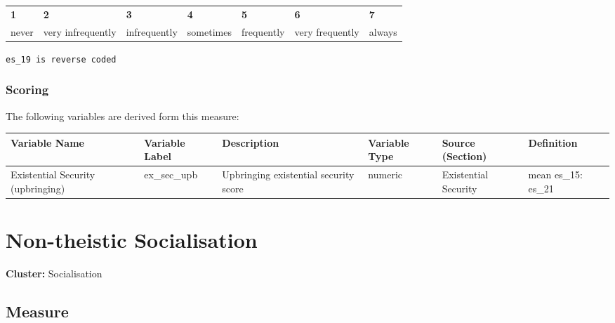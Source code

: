 \documentclass[
  letterpaper,
]{scrbook}
\begin{document}
\begin{longtable}[]{@{}
  >{\raggedright\arraybackslash}p{}
  >{\raggedright\arraybackslash}p{}
  >{\raggedright\arraybackslash}p{}
  >{\raggedright\arraybackslash}p{}
  >{\raggedright\arraybackslash}p{}
  >{\raggedright\arraybackslash}p{}
  >{\raggedright\arraybackslash}p{}@{}}
\toprule\noalign{}
\endhead
\bottomrule\noalign{}
\endlastfoot
\textbf{1} & \textbf{2} & \textbf{3} & \textbf{4} & \textbf{5} &
\textbf{6} & \textbf{7} \\
never & very infrequently & infrequently & sometimes & frequently & very
frequently & always \\
\end{longtable}

\texttt{es\_19\ is\ reverse\ coded}

\subsection{Scoring}\label{scoring-4}

The following variables are derived form this measure:

\begin{tabu} to 
\toprule
Variable Name & Variable Label & Description & Variable Type & Source (Section) & Definition\\
\midrule
Existential Security (upbringing) & ex\_sec\_upb & Upbringing existential security score & numeric & Existential Security & mean es\_15: es\_21\\
\bottomrule
\end{tabu}

\chapter{Non-theistic Socialisation}\label{non-theistic-socialisation}

\textbf{Cluster:} Socialisation

\section{Measure}\label{measure-5}
\end{document}
